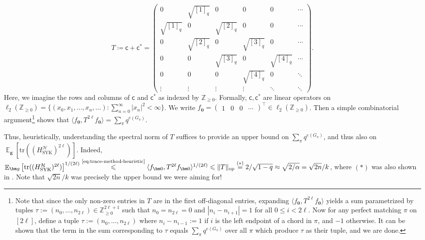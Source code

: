 \documentclass
[11pt,letterpaper]
{article}
\theoremstyle{definition}
\newcommand{\sfc}{\mathsf c}
\newcommand{\1}{\mathbf{1}}
\newcommand{\tr}{\mathrm{tr}}
\newcommand{\Z}{\mathbb Z}
\newcommand{\cH}{\mathcal H}
\DeclareMathOperator*{\E}{\mathbb{E}}
\renewcommand{\geq}{\geqslant}
\renewcommand{\leq}{\leqslant}
\begin{document}
\[
T \coloneqq \sfc+\sfc^*
=
\left(
\begin{array}{cccccc}
0 & \sqrt{[1]_q} & 0 & 0 & 0 & \cdots\\
\sqrt{[1]_q} & 0 & \sqrt{[2]_q} & 0 & 0 & \cdots\\
0 & \sqrt{[2]_q} & 0 & \sqrt{[3]_q} & 0 & \cdots\\
0 & 0 & \sqrt{[3]_q} & 0 & \sqrt{[4]_q} & \cdots\\
0 & 0 & 0 & \sqrt{[4]_q} & 0 & \ddots\\
\vdots & \vdots & \vdots & \vdots & \ddots & \ddots
\end{array}
\right).
\]
Here, we imagine the rows and columns of $\sfc$ and $\sfc^*$ as indexed by $\Z_{\geq 0}$. Formally, $\sfc, \sfc^*$ are linear operators on $\ell_2(\Z_{\geq 0}) = \{(x_0,x_1, \ldots, x_n, \ldots): \sum_{n = 0}^{\infty} |x_n|^2 <\infty\}$. We write $f_{\bm 0} = \begin{pmatrix}
    1 & 0 & 0 & \cdots
\end{pmatrix}^\top\in\ell_2(\Z_{\geq 0})$. Then a simple combinatorial argument\footnote{Note that since the only non-zero entries in $T$ are in the first off-diagonal entries, expanding $\langle f_{\bm 0}, T^{2\ell}f_{\bm 0}\rangle$ yields a sum parametrized by tuples $\tau:= (n_0, \ldots, n_{2\ell})\in\Z_{\geq 0}^{2\ell + 1}$ such that $n_0 = n_{2\ell} = 0$ and $|n_i - n_{i + 1}| = 1$ for all $0\leq i < 2\ell$. Now for any perfect matching $\pi$ on $[2\ell]$, define a tuple $\tau:= (n_0, \ldots, n_{2\ell})$ where $n_{i} - n_{i - 1}:= 1$ if $i$ is the left endpoint of a chord in $\pi$, and $-1$ otherwise. It can be shown that the term in the sum corresponding to $\tau$ equals $\sum_{\pi}q^{e(G_\pi)}$ over all $\pi$ which produce $\tau$ as their tuple, and we are done.} \cite{SYK_Berkooz3} shows that $\langle f_{\bm 0}, T^{2\ell}f_{\bm 0}\rangle = \sum_\pi q^{e(G_\pi)}$. 

Thus, heuristically, understanding the spectral norm of $T$ suffices to provide an upper bound on $\sum_\pi q^{e(G_\pi)}$, and thus also on $\E_{\bm g}\left[\tr((H^\cH_{\operatorname{SYK}})^{2\ell})\right]$. Indeed, $\E_{\bm g}\left[\tr((H^\cH_{\operatorname{SYK}})^{2\ell})\right]^{1/(2\ell)}\overset{\text{\cref{eq:trace-method-heuristic}}}{\leq}\langle f_{\bm 0}, T^{2\ell}f_{\bm 0}\rangle^{1/(2\ell)}\leq\|T\|_{\operatorname{op}} \overset{(\ast)}{=} 2/\sqrt{1 - q}\approx\sqrt{2/\alpha} = \sqrt{2n}/k$, where $(\ast)$ was also shown in \cite{SYK_Berkooz3}. Note that $\sqrt{2n}/k$ was precisely the upper bound we were aiming for! 
\end{document}
